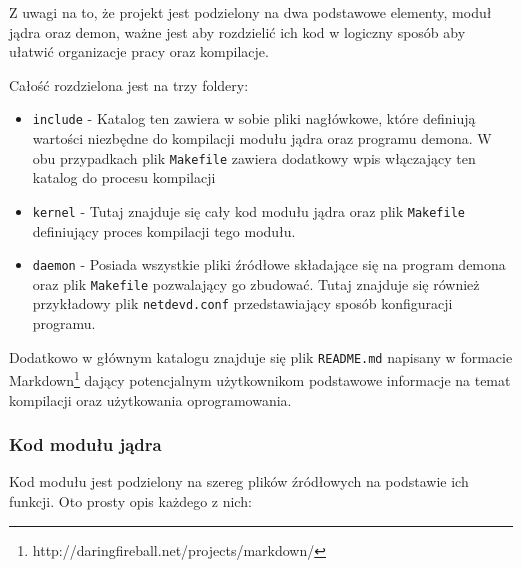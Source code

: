 \documentclass[11pt]{scrartcl}
\begin{document}
Z uwagi na to, że projekt jest podzielony na dwa podstawowe elementy, moduł jądra oraz demon, ważne jest aby rozdzielić ich kod w logiczny sposób aby ułatwić organizacje pracy oraz kompilacje.

Całość rozdzielona jest na trzy foldery:

\begin{itemize}
\itemsep1pt\parskip0pt
\item
  \texttt{include} - Katalog ten zawiera w sobie pliki nagłówkowe, które definiują wartości niezbędne do kompilacji modułu jądra oraz programu demona. W obu przypadkach plik \texttt{Makefile} zawiera dodatkowy wpis włączający ten katalog do procesu kompilacji
\item
  \texttt{kernel} - Tutaj znajduje się cały kod modułu jądra oraz plik
  \texttt{Makefile} definiujący proces kompilacji tego modułu.
\item
  \texttt{daemon} - Posiada wszystkie pliki źródłowe składające się na program demona oraz plik \texttt{Makefile} pozwalający go zbudować.  Tutaj znajduje się również przykładowy plik \texttt{netdevd.conf} przedstawiający sposób konfiguracji programu.
\end{itemize}

Dodatkowo w głównym katalogu znajduje się plik \texttt{README.md} napisany w formacie Markdown\footnote{http://daringfireball.net/projects/markdown/} dający potencjalnym użytkownikom podstawowe informacje na temat kompilacji oraz użytkowania oprogramowania.

\subsubsection{Kod modułu jądra}

Kod modułu jest podzielony na szereg plików źródłowych na podstawie ich funkcji. Oto prosty opis każdego z nich:
\end{document}

